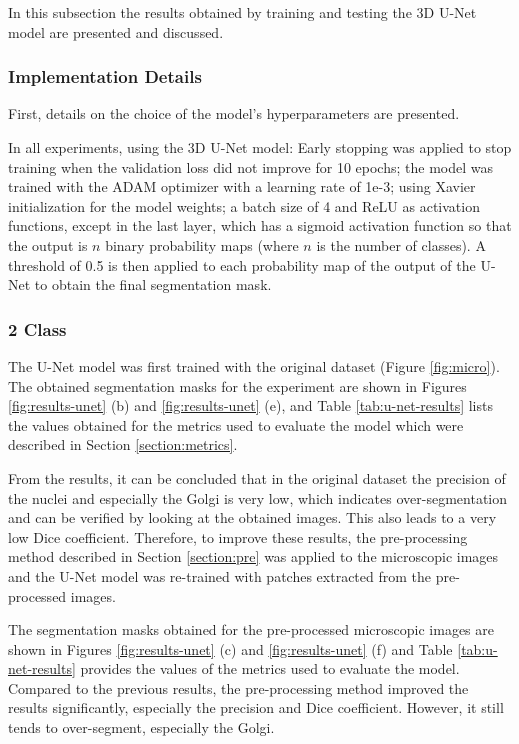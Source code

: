 In this subsection the results obtained by training and testing the \ac{3D} U-Net model are presented and discussed.

\subsubsection*{Implementation Details}

First, details on the choice of the model's hyperparameters are presented.

In all experiments, using the \ac{3D} U-Net model: Early stopping was applied to stop training when the validation loss did not improve for 10 epochs; the model was trained with the ADAM optimizer with a learning rate of 1e-3; using Xavier initialization for the model weights; a batch size of 4 and \ac{ReLU} as activation functions, except in the last layer, which has a sigmoid activation function so that the output is $n$ binary probability maps (where $n$ is the number of classes). A threshold of 0.5 is then applied to each probability map of the output of the U-Net to obtain the final segmentation mask.


\subsubsection*{2 Class}

The U-Net model was first trained with the original dataset (Figure \ref{fig:micro}). The obtained segmentation masks for the experiment are shown in Figures \ref{fig:results-unet} (b) and \ref{fig:results-unet} (e), and Table \ref{tab:u-net-results} lists the values obtained for the metrics used to evaluate the model which were described in Section \ref{section:metrics}.

From the results, it can be concluded that in the original dataset the precision of the nuclei and especially the Golgi is very low, which indicates over-segmentation and can be verified by looking at the obtained images. This also leads to a very low Dice coefficient. Therefore, to improve these results, the pre-processing method described in Section \ref{section:pre} was applied to the microscopic images and the U-Net model was re-trained with patches extracted from the pre-processed images.

The segmentation masks obtained for the pre-processed microscopic images are shown in Figures \ref{fig:results-unet} (c) and \ref{fig:results-unet} (f) and Table \ref{tab:u-net-results} provides the values of the metrics used to evaluate the model. Compared to the previous results, the pre-processing method improved the results significantly, especially the precision and Dice coefficient. However, it still tends to over-segment, especially the Golgi.

